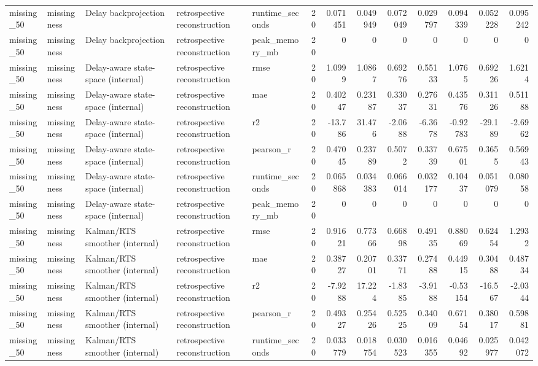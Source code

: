 \begin{table}[!htbp]
{{\begin{tabular}{lllllrrrrrrrr}
missing_50 & missingness & Delay backprojection & retrospective reconstruction & runtime_seconds & 20 & 0.071451 & 0.049949 & 0.072049 & 0.029797 & 0.094339 & 0.052228 & 0.095242 \\
missing_50 & missingness & Delay backprojection & retrospective reconstruction & peak_memory_mb & 20 & 0 & 0 & 0 & 0 & 0 & 0 & 0 \\
missing_50 & missingness & Delay-aware state-space (internal) & retrospective reconstruction & rmse & 20 & 1.0999 & 1.0867 & 0.69276 & 0.55133 & 1.0765 & 0.69226 & 1.6214 \\
missing_50 & missingness & Delay-aware state-space (internal) & retrospective reconstruction & mae & 20 & 0.40247 & 0.23187 & 0.33037 & 0.27631 & 0.43576 & 0.31126 & 0.51188 \\
missing_50 & missingness & Delay-aware state-space (internal) & retrospective reconstruction & r2 & 20 & -13.786 & 31.476 & -2.0688 & -6.3678 & -0.92783 & -29.189 & -2.6962 \\
missing_50 & missingness & Delay-aware state-space (internal) & retrospective reconstruction & pearson_r & 20 & 0.47045 & 0.23789 & 0.5072 & 0.33739 & 0.67501 & 0.3655 & 0.56943 \\
missing_50 & missingness & Delay-aware state-space (internal) & retrospective reconstruction & runtime_seconds & 20 & 0.065868 & 0.034383 & 0.066014 & 0.032177 & 0.10437 & 0.051079 & 0.08058 \\
missing_50 & missingness & Delay-aware state-space (internal) & retrospective reconstruction & peak_memory_mb & 20 & 0 & 0 & 0 & 0 & 0 & 0 & 0 \\
missing_50 & missingness & Kalman/RTS smoother (internal) & retrospective reconstruction & rmse & 20 & 0.91621 & 0.77366 & 0.66898 & 0.49135 & 0.88069 & 0.62454 & 1.2932 \\
missing_50 & missingness & Kalman/RTS smoother (internal) & retrospective reconstruction & mae & 20 & 0.38727 & 0.20701 & 0.33771 & 0.27488 & 0.44915 & 0.30488 & 0.48734 \\
missing_50 & missingness & Kalman/RTS smoother (internal) & retrospective reconstruction & r2 & 20 & -7.9288 & 17.224 & -1.8385 & -3.9188 & -0.53154 & -16.567 & -2.0344 \\
missing_50 & missingness & Kalman/RTS smoother (internal) & retrospective reconstruction & pearson_r & 20 & 0.49327 & 0.25426 & 0.52525 & 0.34009 & 0.67154 & 0.38017 & 0.59881 \\
missing_50 & missingness & Kalman/RTS smoother (internal) & retrospective reconstruction & runtime_seconds & 20 & 0.033779 & 0.018754 & 0.030523 & 0.016355 & 0.04692 & 0.025977 & 0.042072 \\

\end{tabular}}}
\end{table}
